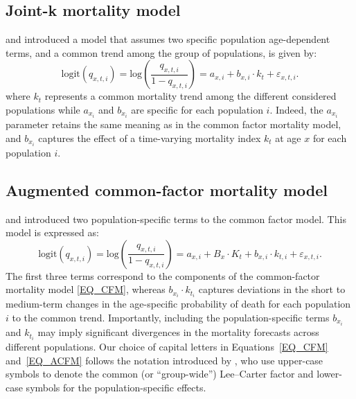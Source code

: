 \subsection{Joint-k mortality model}

\citet{Carter1992} and \citet{Wilmoth2001} introduced a model that assumes two specific population age-dependent terms, and a common trend among the group of populations, is given by:
\begin{equation}
\textrm{logit}\left(q_{x,t,i} \right)=\textrm{log}\left(\frac{q_{x,t,i}}{1-q_{x,t,i}}\right)=a_{x,i} + b_{x,i} \cdot k_{t} + \varepsilon_{x,t,i}.
\label{EQ_jointk}
\end{equation}
where $k_{t}$ represents a common mortality trend among the different considered populations while $a_{x_{i}}$ and $b_{x_{i}}$ are specific for each population $i$. Indeed, the $a_{x_{i}}$ parameter retains the same meaning as in the common factor mortality model, and $b_{x_{i}}$ captures the effect of a time-varying mortality index $k_t$ at age $x$ for each population $i$.

\subsection{Augmented common-factor mortality model}

\citet{Li2005} and \citet{Hyndman2013} introduced two population-specific terms to the common factor model. This model is expressed as:
\begin{equation}
\textrm{logit}\left(q_{x,t,i} \right)=\textrm{log}\left(\frac{q_{x,t,i}}{1-q_{x,t,i}}\right)=a_{x,i} + B_x \cdot K_t + b_{x,i} \cdot k_{t,i} + \varepsilon_{x,t,i}.
\label{EQ_ACFM}
\end{equation}
The first three terms correspond to the components of the common-factor mortality model \eqref{EQ_CFM}, whereas $b_{x_i} \cdot k_{t_i}$ captures deviations in the short to medium-term changes in the age-specific probability of death for each population $i$ to the common trend. Importantly, including the population-specific terms $b_{x_i}$ and $k_{t_i}$ may imply significant divergences in the mortality forecasts across different populations. {Our choice of capital letters in Equations~\eqref{EQ_CFM} and~\eqref{EQ_ACFM} follows the notation introduced by \citet{Li2005}, who use upper-case symbols to denote the common (or ``group-wide'') Lee--Carter factor and lower-case symbols for the population-specific effects.}

